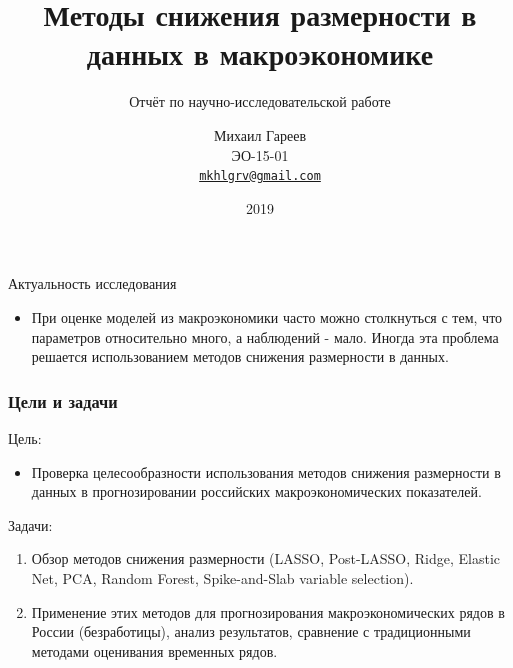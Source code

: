 \documentclass[c, dvipsnames]{beamer}  %
\title[МСР в макроэкономике]{Методы снижения размерности в данных в макроэкономике}
\subtitle{Отчёт по научно-исследовательской работе}
\author[Михаил Гареев]{Михаил Гареев \\ \smallskip \scriptsize ЭО-15-01 \\ \smallskip \scriptsize \href{mailto:mkhlgrv@gmail.com}{\nolinkurl{mkhlgrv@gmail.com} }}
\institute[РАНХиГС]{ \uppercase{
  Российская Академия Народного Хозяйства и  \\ Государственной Службы при Президенте Российской Федерации}}
\date{2019}
\begin{document}
\frame[plain]{\titlepage}	%


\begin{frame}[c]{Актуальность исследования} 
\begin{itemize}
\item  При оценке моделей из макроэкономики часто можно столкнуться с тем, что параметров относительно много, а наблюдений - мало. Иногда эта проблема решается использованием \alert{методов снижения размерности в данных}.
\end{itemize}
\end{frame}




\begin{frame}[shrink=3]
	\frametitle{Цели и задачи}
	\begin{block}{Цель:}
	\begin{itemize}
		\item Проверка целесообразности использования методов снижения размерности в данных в прогнозировании российских макроэкономических показателей.
	\end{itemize}
		
	\end{block}

	 	\begin{block}{Задачи:}
			\begin{enumerate}
	\item Обзор методов снижения размерности (LASSO, Post-LASSO, Ridge, Elastic Net, PCA, Random Forest, Spike-and-Slab variable selection).
    \item Применение этих методов для прогнозирования макроэкономических
рядов в России (безработицы), анализ результатов, сравнение с традиционными методами оценивания временных рядов.
	 \end{enumerate}	
	\end{block}
\end{frame}
\end{document}
